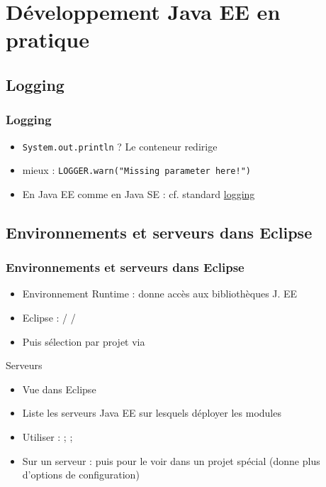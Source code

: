 \documentclass[english, french]{beamer}
\begin{document}
\section[J. EE en pratique]{Développement Java EE en pratique}
\subsection{Logging}
\begin{frame}
	\frametitle{Logging}
	\begin{itemize}
		\item \texttt{System.out.println} ? \pause Le conteneur redirige\pause
		\item \alert{mieux} : \texttt{LOGGER.warn("Missing parameter here!")}
		\item En Java EE comme en Java SE : cf. standard \href{http://docs.oracle.com/javase/8/docs/technotes/guides/logging/index.html}{logging}
	\end{itemize}
\end{frame}

\subsection[Environnements et serveurs]{Environnements et serveurs dans Eclipse}
\begin{frame}
	\frametitle{Environnements et serveurs dans Eclipse}
	\begin{itemize}
		\item Environnement Runtime : donne accès aux bibliothèques J. EE
		\item Eclipse :  /  / 
		\item Puis sélection par projet via 
	\end{itemize}
	\begin{block}{Serveurs}
		\begin{itemize}
			\item Vue  dans Eclipse
			\item Liste les serveurs Java EE sur lesquels déployer les modules
			\item Utiliser :  ;  ; 
			\item Sur un serveur :  puis  pour le voir dans un projet spécial (donne plus d’options de configuration)
		\end{itemize}
	\end{block}
\end{frame}
\end{document}
